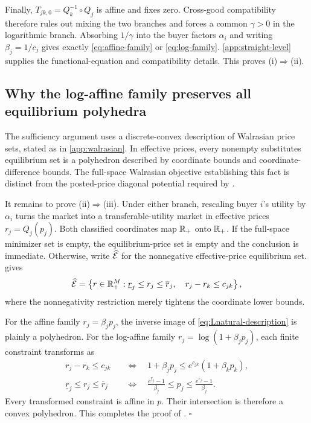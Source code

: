 Finally, $T_{jk,0}=Q_k^{-1}\circ Q_j$ is affine and fixes zero. Cross-good compatibility therefore rules out mixing the two branches and forces a common $\gamma>0$ in the logarithmic branch. Absorbing $1/\gamma$ into the buyer factors $\alpha_i$ and writing $\beta_j=1/c_j$ gives exactly \eqref{eq:affine-family} or \eqref{eq:log-family}. \ref{app:straight-level} supplies the functional-equation and compatibility details. This proves (i)$\Rightarrow$(ii).

\subsection{Why the log-affine family preserves all equilibrium polyhedra}

The sufficiency argument uses a discrete-convex description of Walrasian price sets, stated as  in \ref{app:walrasian}. In effective prices, every nonempty substitutes equilibrium set is a polyhedron described by coordinate bounds and coordinate-difference bounds. The full-space Walrasian objective establishing this fact is distinct from the posted-price diagonal potential required by .

It remains to prove (ii)$\Rightarrow$(iii). Under either branch, rescaling buyer $i$'s utility by $\alpha_i$ turns the market into a transferable-utility market in effective prices $r_j=Q_j(p_j)$. Both classified coordinates map $\mathbb{R}_+$ onto $\mathbb{R}_+$. If the full-space minimizer set is empty, the equilibrium-price set is empty and the conclusion is immediate. Otherwise, write $\widehat{\mathcal{E}}$ for the nonnegative effective-price equilibrium set.  gives
\begin{equation}\label{eq:Lnatural-description}
\widehat{\mathcal{E}}=
\left\{r\in\mathbb{R}_+^M:
\underline r_j\le r_j\le\overline r_j,
\quad r_j-r_k\le c_{jk}
\right\},
\end{equation}
where the nonnegativity restriction merely tightens the coordinate lower bounds.

For the affine family $r_j=\beta_jp_j$, the inverse image of \eqref{eq:Lnatural-description} is plainly a polyhedron. For the log-affine family $r_j=\log(1+\beta_jp_j)$, each finite constraint transforms as
\begin{align*}
r_j-r_k\le c_{jk}
&\quad\Longleftrightarrow\quad
1+\beta_jp_j\le e^{c_{jk}}(1+\beta_kp_k),\\
\underline r_j\le r_j\le\overline r_j
&\quad\Longleftrightarrow\quad
\frac{e^{\underline r_j}-1}{\beta_j}
\le p_j\le
\frac{e^{\overline r_j}-1}{\beta_j}.
\end{align*}
Every transformed constraint is affine in $p$. Their intersection is therefore a convex polyhedron. This completes the proof of . \hfill$\square$


